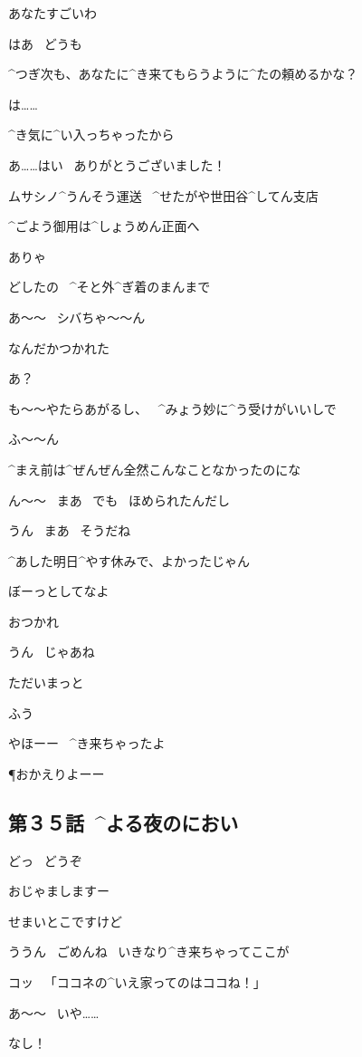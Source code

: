 \R あなたすごいわ

\K はあ
\ どうも

\page
\R ^{つぎ}{次}も、あなたに^{き}{来}てもらうように^{たの}{頼}めるかな？

\K は……

\R ^{き}{気}に^{い}{入}っちゃったから

\K あ……はい
\ ありがとうございました！

\page[37]
\Sign ムサシノ^{うんそう}{運送}
\ ^{せたがや}{世田谷}^{してん}{支店}

\Sign ^{ごよう}{御用}は^{しょうめん}{正面}へ

\SH ありゃ

\SH どしたの
\ ^{そと}{外}^{ぎ}{着}のまんまで

\K あ〜〜
\ シバちゃ〜〜ん

\K なんだかつかれた

\SH あ？

\page
\K も〜〜やたらあがるし、
\ ^{みょう}{妙}に^{う}{受}けがいいしで

\SH ふ〜〜ん

\K ^{まえ}{前}は^{ぜんぜん}{全然}こんなことなかったのにな

\SH ん〜〜
\ まあ
\ でも
\ ほめられたんだし

\K うん
\ まあ
\ そうだね

\SH ^{あした}{明日}^{やす}{休}みで、よかったじゃん

\SH ぼーっとしてなよ

\SH おつかれ

\K うん
\ じゃあね

\page
\K ただいまっと

\K ふう

\page
\A やほーー
\ ^{き}{来}ちゃったよ

\P おかえりよーー


\subsection{第３５話\ ^{よる}{夜}のにおい}

\page[42]
\K どっ
\ どうぞ

\A おじゃましますー

\page
\K せまいとこですけど

\A ううん
\ ごめんね
\ いきなり^{き}{来}ちゃってここが

\A コッ
\ 「ココネの^{いえ}{家}ってのはココね！」

\A あ〜〜
\ いや……

\A なし！

